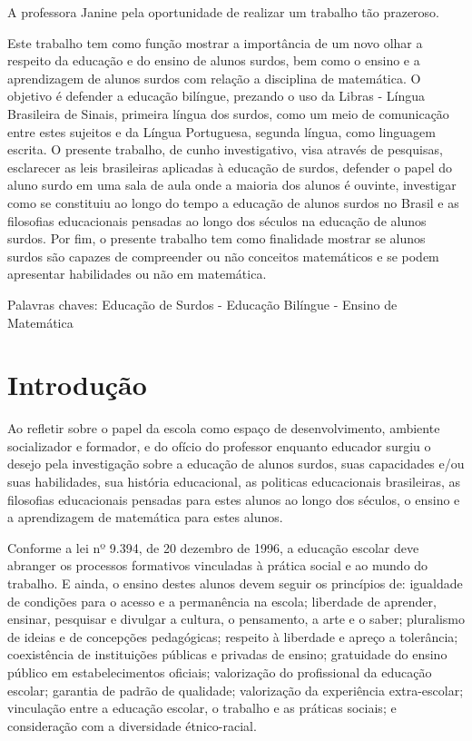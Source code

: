 \documentclass[brasil]{abnt}
\begin{document}
	A professora Janine pela oportunidade de realizar um trabalho tão prazeroso.

\begin{resumo}
	Este trabalho tem como função mostrar a importância de um novo olhar a respeito da educação e do ensino de alunos surdos, bem como o ensino e a aprendizagem de alunos surdos com
	relação a disciplina de matemática. O objetivo é defender a educação bilíngue, prezando o uso da Libras - Língua Brasileira de Sinais, primeira língua dos surdos, como um meio de comunicação entre estes sujeitos 
	e da Língua Portuguesa, segunda língua, como linguagem escrita. O presente trabalho, de cunho investigativo, visa através de pesquisas, esclarecer as leis brasileiras aplicadas à 
	educação  de surdos, defender o papel do aluno surdo em uma sala de aula onde a maioria dos alunos é ouvinte, investigar como se constituiu ao longo do tempo a educação de alunos 
	surdos no Brasil e as filosofias educacionais pensadas ao longo dos séculos na educação de alunos surdos. Por fim, o presente trabalho tem como finalidade mostrar se alunos surdos
	são capazes de compreender ou não conceitos matemáticos e se podem apresentar habilidades ou não em matemática.   
	
	Palavras chaves: Educação de Surdos - Educação Bilíngue - Ensino de Matemática  

\end{resumo}

\tableofcontents

\chapter*{Introdução}
	
	Ao refletir sobre o papel da escola como  espaço de desenvolvimento, ambiente socializador e formador, e do ofício do professor enquanto educador surgiu o desejo pela investigação
	sobre a educação de alunos surdos, suas capacidades e/ou suas habilidades, sua história educacional, as politicas educacionais brasileiras, as filosofias educacionais pensadas para estes alunos
	ao longo dos séculos, o ensino e a aprendizagem de matemática para estes alunos.  
		
	Conforme a lei nº 9.394, de 20 dezembro de 1996, a educação escolar 
	deve abranger os processos formativos vinculadas à prática social e 
	ao mundo do trabalho. E ainda, o ensino destes alunos devem seguir 
	os princípios de: igualdade de condições para o acesso e a 
	permanência na escola; liberdade de aprender, ensinar, pesquisar e 
	divulgar a cultura, o pensamento, a arte e o saber; pluralismo de 
	ideias e de concepções pedagógicas; respeito à liberdade e apreço 
	a tolerância; coexistência de instituições públicas e privadas de 
	ensino; gratuidade do ensino público em estabelecimentos oficiais; 
	valorização do profissional da educação escolar;  
	garantia de padrão de qualidade; valorização da experiência 
	extra-escolar; vinculação entre a educação escolar, o trabalho e 
	as práticas sociais; e consideração com a diversidade étnico-racial.  
	
\end{document}
